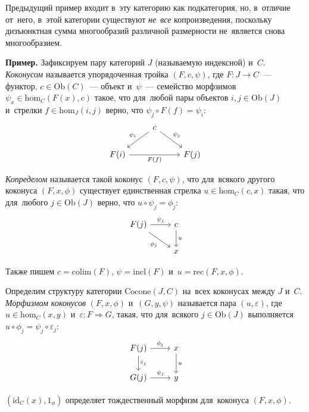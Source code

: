 \documentclass{article}
\begin{document}
Предыдущий пример входит в~эту категорию как подкатегория, но, в~отличие от~него, в~этой категории
существуют \textit{не~все} копроизведения, поскольку дизъюнктная сумма многообразий различной размерности
не~является снова многообразием.
\medskip

\noindent\textbf{Пример.} Зафиксируем пару категорий $J$ (называемую индексной) и~$C$. \textit{Коконусом} называется упорядоченная
тройка $(F, c, \psi)$, где $F : J \rightarrow C$~— функтор, $c \in \mathrm{Ob}(C)$~— объект
и~$\psi$~— семейство морфзимов $\psi_x \in \mathrm{hom}_C(F(x), c)$ такое, что для~любой
пары объектов $i, j \in \mathrm{Ob}(J)$ и~стрелки $f \in \mathrm{hom}_J(i, j)$ верно,
что $\psi_j \circ F(f) = \psi_i$:
\[
    \begin{tikzcd}
        &                               & \arrow{ld}{}[swap]{\psi_i} c \arrow{rd}{\psi_j} &      & \\
        & F(i) \arrow{rr}{}[swap]{F(f)} &                                                 & F(j) &
    \end{tikzcd}
\]

\textit{Копределом} называется такой коконус $(F, c, \psi)$, что для~всякого другого коконуса $(F, x, \phi)$
существует единственная стрелка $u \in \mathrm{hom}_C(c, x)$ такая, что для~любого $j \in \mathrm{Ob}(J)$
верно, что $u \circ \psi_j = \phi_j$:
\[
    \begin{tikzcd}
        F(j) \arrow{r}{\psi_j} \arrow{dr}{}[swap]{\phi_j} & \arrow{d}{u} c \\
                                                          & x
    \end{tikzcd}
\]

Также пишем $c = \mathrm{colim}(F)$, $\psi = \mathrm{incl}(F)$ и~$u = \mathrm{rec}(F, x, \phi)$.

Определим структуру категории $\mathrm{Cocone}(J, C)$ на~всех коконусах между $J$ и~$C$.
\textit{Морфизмом коконусов} $(F, x, \phi)$ и~$(G, y, \psi)$ называется пара $(u, \varepsilon)$,
где $u \in \mathrm{hom}_C(x, y)$ и~$\varepsilon : F \Rightarrow G$, такая, что для~всякого $j \in \mathrm{Ob}(J)$
выполняется $u \circ \phi_j = \psi_j \circ \varepsilon_j$:
\[
    \begin{tikzcd}
        \arrow{d}{\varepsilon_j} F(j) \arrow{r}{\phi_j} & \arrow{d}{u} x \\
                                 G(j) \arrow{r}{\psi_j} &              y
    \end{tikzcd}
\]

$(\mathrm{id}_C(x), 1_\phi)$ определяет тождественный морфизм для~коконуса $(F, x, \phi)$.
\end{document}
